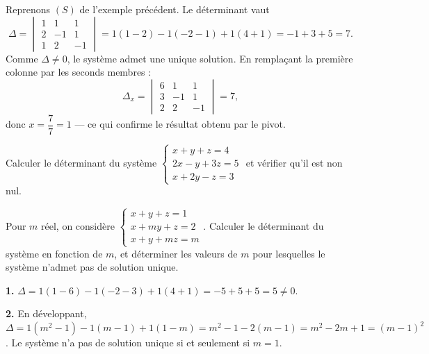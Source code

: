 
\begin{exemple}
Reprenons $(S)$ de l'exemple précédent. Le déterminant vaut
\[
  \Delta = \begin{vmatrix} 1 & 1 & 1 \\ 2 & -1 & 1 \\ 1 & 2 & -1 \end{vmatrix}
  = 1(1-2)-1(-2-1)+1(4+1) = -1+3+5 = 7 .
\]
Comme $\Delta \neq 0$, le système admet une unique solution. En remplaçant la
première colonne par les seconds membres :
\[
  \Delta_{x} = \begin{vmatrix} 6 & 1 & 1 \\ 3 & -1 & 1 \\ 2 & 2 & -1 \end{vmatrix} = 7,
\]
donc $x = \dfrac{7}{7} = 1$ — ce qui confirme le résultat obtenu par le pivot.
\end{exemple}

\begin{entrainement}[Cramer]
\exo[\niveau{2}] Calculer le déterminant du système
$\begin{cases} x+y+z=4 \\ 2x-y+3z=5 \\ x+2y-z=3 \end{cases}$
et vérifier qu'il est non nul.

\exo[\niveau{3}] Pour $m$ réel, on considère
$\begin{cases} x+y+z=1 \\ x+my+z=2 \\ x+y+mz=m \end{cases}$.
Calculer le déterminant du système en fonction de $m$, et déterminer les
valeurs de $m$ pour lesquelles le système n'admet pas de solution unique.
\end{entrainement}

\begin{corrige}
\textbf{1.} $\Delta = 1(1-6)-1(-2-3)+1(4+1) = -5+5+5 = 5 \neq 0$.

\textbf{2.} En développant,
$\Delta = 1(m^{2}-1)-1(m-1)+1(1-m) = m^{2}-1-2(m-1) = m^{2}-2m+1 = (m-1)^{2}$.
Le système n'a pas de solution unique si et seulement si $m=1$.
\end{corrige}

